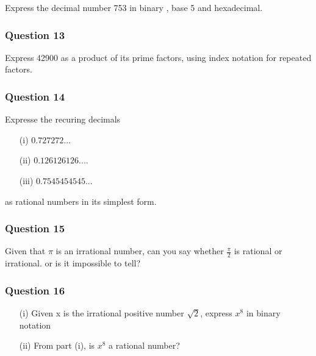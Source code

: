 \documentclass[]{report}
\begin{document}
\begin{enumerate}
Express the decimal number 753 in binary , base 5 and hexadecimal.

\subsubsection*{Question 13}

Express 42900 as a product of its prime factors, using index notation for repeated factors.

\subsubsection*{Question 14}

Expresse the recuring decimals 
\begin{itemize}
\item[(i)] $0.727272\ldots$
\item[(ii)] $0.126126126....$
\item[(iii)] $0.7545454545...$
\end{itemize} 
as rational numbers in its simplest form.

\subsubsection*{Question 15}
Given that $\pi$ is an irrational number, can you say whether $\frac{\pi}{2}$ is rational or irrational.
or is it impossible to tell?

\subsubsection*{Question 16}
\begin{itemize}
\item[(i)] Given x is the irrational positive number $\sqrt{2}$, express $x^8$ in binary notation\\
\item[(ii)] From part (i), is $x^8$ a rational number?
\end{itemize}


\end{enumerate}
\end{document}
